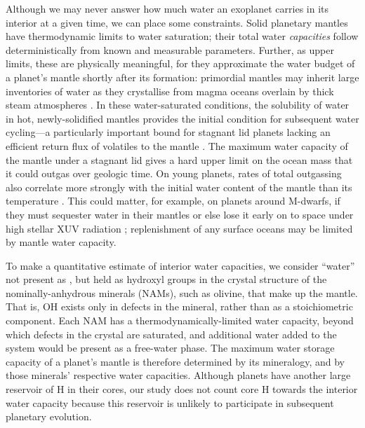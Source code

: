 Although we may never answer how much water an exoplanet carries in its interior at a given time, we can place some constraints. Solid planetary mantles have thermodynamic limits to water saturation; their total water \textit{capacities} follow deterministically from known and measurable parameters. Further, as upper limits, these are physically meaningful, for they approximate the water budget of a planet's mantle shortly after its formation: primordial mantles may inherit large inventories of water as they crystallise from magma oceans overlain by thick steam atmospheres \citep{tikoo_fate_2017, dorn_hidden_2021, bower_retention_2021, miyazaki_wet_2022, salvador_convective_2023}. In these water-saturated conditions, the solubility of water in hot, newly-solidified mantles provides the initial condition for subsequent water cycling---a particularly important bound for stagnant lid planets lacking an efficient return flux of volatiles to the mantle \citep[e.g.,][]{foley_carbon_2018}. The maximum water capacity of the mantle under a stagnant lid gives a hard upper limit on the ocean mass that it could outgas over geologic time. On young planets, rates of total outgassing also correlate more strongly with the initial water content of the mantle than its temperature \citep{guimond_low_2021}. This could matter, for example, on planets around M-dwarfs, if they must sequester water in their mantles or else lose it early on to space under high stellar XUV radiation \citep{wordsworth_water_2013, luger_extreme_2015, godolt_habitability_2019, fleming_xuv_2020, moore_keeping_2020}; replenishment of any surface oceans may be limited by mantle water capacity.


To make a quantitative estimate of interior water capacities, we consider ``water'' not present as , but held as hydroxyl groups in the crystal structure of the nominally-anhydrous minerals (NAMs), such as olivine, that make up the mantle. That is, OH exists only in defects in the mineral, rather than as a stoichiometric component. Each NAM has a thermodynamically-limited water capacity, beyond which defects in the crystal are saturated, and additional water added to the system would be present as a free-water phase. The maximum water storage capacity of a planet's mantle is therefore determined by its mineralogy, and by those minerals' respective water capacities. Although planets have another large reservoir of H in their cores, our study does not count core H towards the interior water capacity because this reservoir is unlikely to participate in subsequent planetary evolution.


